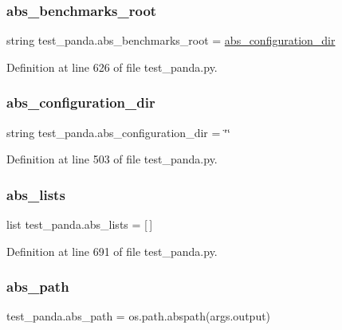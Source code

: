 \subsubsection{\texorpdfstring{abs\+\_\+benchmarks\+\_\+root}{abs\_benchmarks\_root}}
{\footnotesize\ttfamily string test\+\_\+panda.\+abs\+\_\+benchmarks\+\_\+root = \hyperlink{namespacetest__panda_ae81c2fb49691eabd091c55b5c5fdba1c}{abs\+\_\+configuration\+\_\+dir}}



Definition at line 626 of file test\+\_\+panda.\+py.

\mbox{\label{namespacetest__panda_ae81c2fb49691eabd091c55b5c5fdba1c}} 
\subsubsection{\texorpdfstring{abs\+\_\+configuration\+\_\+dir}{abs\_configuration\_dir}}
{\footnotesize\ttfamily string test\+\_\+panda.\+abs\+\_\+configuration\+\_\+dir = \char`\"{}\char`\"{}}



Definition at line 503 of file test\+\_\+panda.\+py.

\mbox{\label{namespacetest__panda_a5d4a47813f8791042aa7f9d7a299a813}} 
\subsubsection{\texorpdfstring{abs\+\_\+lists}{abs\_lists}}
{\footnotesize\ttfamily list test\+\_\+panda.\+abs\+\_\+lists = \mbox{[}$\,$\mbox{]}}



Definition at line 691 of file test\+\_\+panda.\+py.

\mbox{\label{namespacetest__panda_a78bb23566d04ac65a03195681449d2c0}} 
\subsubsection{\texorpdfstring{abs\+\_\+path}{abs\_path}}
{\footnotesize\ttfamily test\+\_\+panda.\+abs\+\_\+path = os.\+path.\+abspath(args.\+output)}



